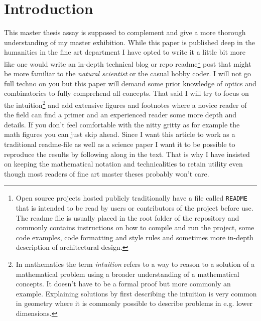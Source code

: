 \documentclass{article}
\begin{document}
\section{Introduction}
This master thesis assay is supposed to complement and give a more
thorough understanding of my master exhibition. While this paper is published deep
in the humanities in the fine art department I have opted to write it a
little bit more like one would write an in-depth technical blog or repo
readme\footnote{Open source projects hosted publicly traditionally have
  a file called \texttt{README} that is intended to be read by users or
  contributors of the project before use. The readme file is usually
  placed in the root folder of the repository and commonly contains
  instructions on how to compile and run the project, some code
  examples, code formatting and style rules and sometimes more in-depth
  description of architectural design.} post that might be more familiar
to the \emph{natural scientist} or the casual hobby coder. I will not go
full techno on you but this paper will demand some prior knowledge of
optics and combinatorics to fully comprehend all concepts. That said I
will try to focus on the intuition\footnote{In mathematics the term
  \emph{intuition} refers to a way to reason to a solution of a
  mathematical problem using a broader understanding of a mathematical
  concepts. It doesn't have to be a formal proof but more commonly an
  example. Explaining solutions by first describing the intuition is
  very common in geometry where it is commonly possible to describe
  problems in e.g. lower dimensions.} and add extensive figures and
footnotes where a novice reader of the field can find a primer and an
experienced reader some more depth and details. If you don't feel
comfortable with the nitty gritty as for example the math figures you
can just skip ahead. Since I want this article to work as a traditional
readme-file as well as a science paper I want it to be possible to
reproduce the results by following along in the text. That is why I have
insisted on keeping the mathematical notation and technicalities to retain
utility even though most readers of fine art master theses probably
won't care.
\end{document}
